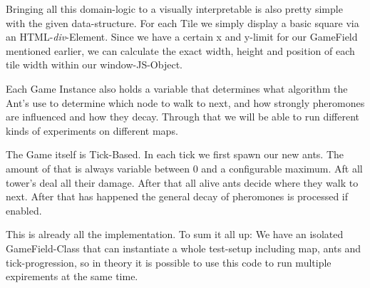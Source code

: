 Bringing all this domain-logic to a visually interpretable is also pretty simple with the given data-structure. For each Tile we simply display a basic square via an HTML-\textit{div}-Element. Since we have a certain x and y-limit for our GameField mentioned earlier, we can calculate the exact width, height and position of each tile width within our window-JS-Object\cite[P. 570]{goodman2002dynamic}.

Each Game Instance also holds a variable that determines what algorithm the Ant's use to determine which node to walk to next, and how strongly pheromones are influenced and how they decay. Through that we will be able to run different kinds of experiments on different maps.

The Game itself is Tick-Based. In each tick we first spawn our new ants. The amount of that is always variable between 0 and a configurable maximum. Aft all tower's deal all their damage. After that all alive ants decide where they walk to next. After that has happened the general decay of pheromones is processed if enabled.

This is already all the implementation. To sum it all up: We have an isolated GameField-Class that can instantiate a whole test-setup including map, ants and tick-progression, so in theory it is possible to use this code to run multiple expirements at the same time.
